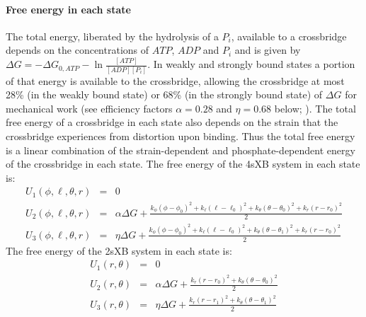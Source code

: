 \documentclass[]{article}
\begin{document}
\paragraph{Free energy in each state} %
The total energy, liberated by the hydrolysis of a $P_i$, available to a crossbridge depends on the concentrations of $ATP$, $ADP$ and $P_i$ and is given by $\Delta G = -\Delta G_{0,ATP} - \ln \frac{[ATP]}{[ADP] [P_i]}$. 
In weakly and strongly bound states a portion of that energy is available to the crossbridge, allowing the crossbridge at most 28\% (in the weakly bound state) or 68\% (in the strongly bound state) of $\Delta G$ for mechanical work (see efficiency factors $\alpha=0.28$ and $\eta=0.68$ below; \citet{Pate:1989:p181, Tanner:2007:pe115}).
The total free energy of a crossbridge in each state also depends on the strain that the crossbridge experiences from distortion upon binding.
Thus the total free energy is a linear combination of the strain-dependent and phosphate-dependent energy of the crossbridge in each state.
The free energy of the 4sXB system in each state is: 
\begin{eqnarray}
\label{4sEnergy}
U_1(\phi,\ell,\theta,r) & = & 0 \nonumber \\
U_2(\phi,\ell,\theta,r) & = & \alpha \Delta G + \frac{k_\phi (\phi-\phi_0)^2 + k_\ell (\ell-\ell_0)^2 + k_\theta (\theta-\theta_0)^2 + k_r (r-r_0)^2}{2} \nonumber \\
U_3(\phi,\ell,\theta,r) & = & \eta \Delta G + \frac{k_\phi (\phi-\phi_0)^2 + k_\ell (\ell-\ell_0)^2 + k_\theta (\theta-\theta_1)^2 + k_r (r-r_0)^2}{2} \nonumber
\end{eqnarray}
The free energy of the 2sXB system in each state is: 
\begin{eqnarray}
\label{2sEnergy}
	U_1(r,\theta) & = & 0 \nonumber \\
    U_2(r,\theta) & = & \alpha \Delta G + \frac{k_r (r - r_0)^2 + 
                        k_\theta (\theta - \theta_0)^2}{2} \nonumber \\
    U_3(r,\theta) & = & \eta \Delta G   + \frac{k_r (r - r_1)^2 + 
                        k_\theta (\theta - \theta_1)^2}{2} \nonumber
\end{eqnarray}
\end{document}
